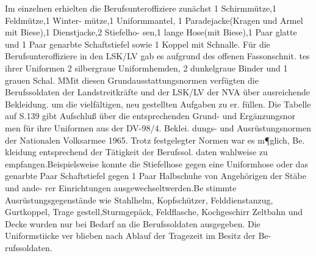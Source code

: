 Im einzelnen erhielten die Berufsunteroffiziere
zunächst 1 Schirmmütze,1 Feldmütze,1 Winter-
mütze,1 Uniformmantel, 1 Paradejacke(Kragen
und Armel mit Biese),1 Dienstjacke,2 Stiefelho-
sen,1 lange Hose(mit Biese),1 Paar glatte und
1 Paar genarbte Schaftstiefel sowie 1 Koppel mit
Schnalle. Für die Berufsunteroffiziere in den
LSK/LV gab es aufgrund des offenen Fassonschnit.
tes ihrer Uniformen 2 silbergraue Uniformhemden,
2 dunkelgraue Binder und 1 grauen Schal.
MMit diesen Grundausstattungsnormen verfügten
die Berufssoldaten der Landstreitkräfte und der
LSK/LV der NVA über ausreichende Bekleidung.
um die vielfältigen, neu gestellten Aufgaben zu er.
füllen. Die Tabelle auf S.139 gibt Aufschluß über
die entsprechenden Grund- und Ergänzungsnor
men für ihre Uniformen aus der DV-98/4. Beklei.
dungs- und Ausrüstungsnormen der Nationalen
Volksarmee 1965.
Trotz festgelegter Normen war es m¶glich, Be.
kleidung entsprechend der Tätigkeit der Berufssol.
daten wahlweise zu empfangen.Beispielsweise
konnte die Stiefelhose gegen eine Uniformhose
oder das genarbte Paar Schaftstiefel gegen 1 Paar
Halbschuhe von Angehörigen der Stäbe und ande-
rer Einrichtungen ausgewechseltwerden.Be
stimmte Ausrüstungsgegenstände wie Stahlhelm,
Kopfschützer, Felddienstanzug, Gurtkoppel, Trage
gestell,Sturmgepäck, Feldflasche, Kochgeschirr
Zeltbahn und Decke wurden nur bei Bedarf an die
Berufssoldaten ausgegeben. Die Uniformstiicke ver
blieben nach Ablauf der Tragezeit im Besitz der Be-
rufssoldaten.